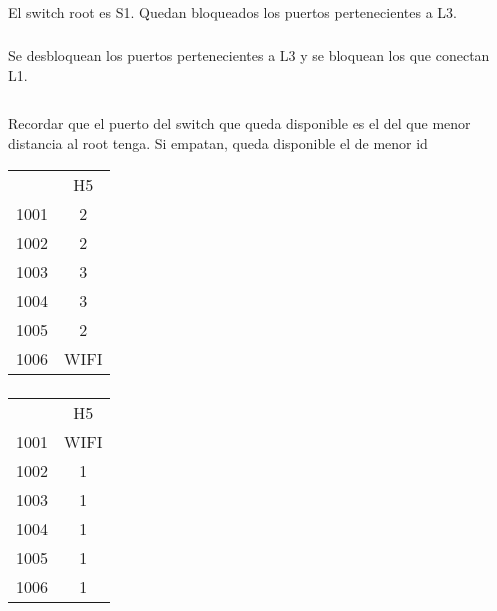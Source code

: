 \setcounter{subsection}{3}
\subsection{}
\subsubsection{}
El switch root es S1. Quedan bloqueados los puertos pertenecientes a L3.

\subsubsection{}
Se desbloquean los puertos pertenecientes a L3 y se bloquean los que conectan L1.

\setcounter{subsection}{5}
\subsection{}
\subsubsection{}
Recordar que el puerto del switch que queda disponible es el del que menor distancia al root tenga. Si empatan, queda disponible el de menor id
\begin{tabular}{c|c}
& H5 \\
1001 & 2 \\
1002 & 2 \\
1003 & 3 \\
1004 & 3 \\
1005 & 2 \\
1006 & WIFI \\
\end{tabular}

\subsubsection{}
\begin{tabular}{c|c}
& H5 \\
1001 & WIFI \\
1002 & 1 \\
1003 & 1 \\
1004 & 1 \\
1005 & 1 \\
1006 & 1 \\
\end{tabular}

\subsection{}
